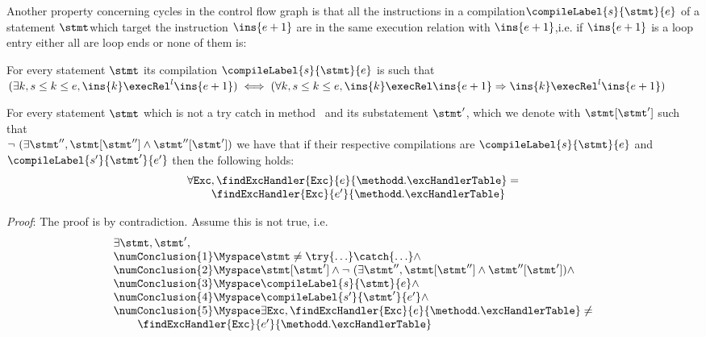Another property concerning cycles in the control flow graph is that all the instructions in a compilation$\compileLabel{s}{\stmt}{e}$   of a statement $\stmt 
$which target the instruction $\ins{e+1}$  are in the same execution relation with  $\ins{e+1}$,i.e. if  
$\ins{e+1}$ is a  loop entry either all are loop ends or none of them is:
\begin{compProp5}\label{compile:prop:compProp5} 
 For every statement $\stmt$ its compilation $\compileLabel{s}{\stmt}{e}$ is such that 
$(\exists k, s \le k \le e, \ins{k} \execRel^{l} \ins{e+1} ) \iff (\forall k, s \le k \le e, \ins{k} \execRel \ins{e+1}  \Rightarrow \ins{k} \execRel^{l} \ins{e+1} ) $
\end{compProp5}





\begin{compProp8}\label{compile:prop:compProp8}
  For every statement $\stmt$ which is not a try catch  in method \methodd \  and  its substatement $\stmt'$, which we denote with $\stmt[\stmt']$   
 such that \\ $\neg \ ( \exists \stmt'', \stmt[\stmt''] \wedge \stmt''[\stmt']  ) $ we have that 
if their respective compilations are  $\compileLabel{s}{\stmt}{e}$ and  $\compileLabel{s'}{\stmt'}{e'}$ then the following holds:
$$ \begin{array}{l}
          \forall \mbox{\rm\tt{Exc}}, \findExcHandler{\mbox{\rm\tt{Exc}} }{e}{\methodd.\excHandlerTable} = \\
	  \phantom{\forall \mbox{\rm\tt{Exc}} }\findExcHandler{\mbox{\rm\tt{Exc}} }{e'}{\methodd.\excHandlerTable} 
   \end{array}
$$

\end{compProp8}
\textit{Proof}:
The proof is by contradiction. Assume this is not true, i.e.
 $$\begin{array}{l} \exists \stmt, \stmt' ,   \\
       \numConclusion{1}    \Myspace \stmt \neq \try \{ \ldots \} \catch \{ \ldots \} \wedge \\
       \numConclusion{2}   \Myspace  \stmt[\stmt'] \wedge \neg \ ( \exists \stmt'', \stmt[\stmt''] \wedge \stmt''[\stmt']  ) \wedge \\
       \numConclusion{3}  \Myspace  \compileLabel{s}{\stmt}{e} \wedge \\
       \numConclusion{4} \Myspace  \compileLabel{s'}{\stmt'}{e'} \wedge \\
       \numConclusion{5}  \Myspace \exists  \mbox{\rm\tt{Exc}}, \findExcHandler{\mbox{\rm\tt{Exc}} }{e}{\methodd.\excHandlerTable} \neq \\
                                            \phantom{\exists \mbox{\rm\tt{Exc}} }\findExcHandler{\mbox{\rm\tt{Exc}} }{e'}{\methodd.\excHandlerTable}    
\end{array}
$$

